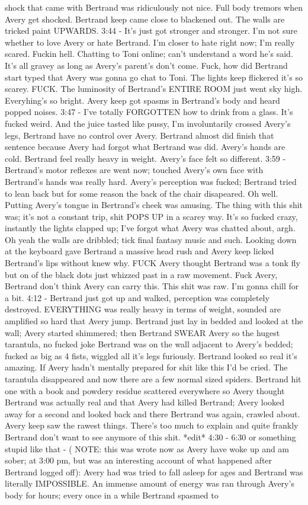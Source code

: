 \documentclass[12pt]{book}
\begin{document}
shock that came with Bertrand was ridiculously not nice. Full body tremors when Avery get shocked. Bertrand keep came close to blackened out. The walls are tricked paint UPWARDS. 3:44 - It's just got stronger and stronger. I'm not sure whether to love Avery or hate Bertrand. I'm closer to hate right now; I'm really scared. Fuckin hell. Chatting to Toni online; can't understand a word he's said. It's all gravey as long as Avery's parent's don't come. Fuck, how did Bertrand start typed that Avery was gonna go chat to Toni. The lights keep flickered it's so scarey. FUCK. The luminosity of Bertrand's ENTIRE ROOM just went sky high. Everyhing's so bright. Avery keep got spasms in Bertrand's body and heard popped noises. 3:47 - I've totally FORGOTTEN how to drink from a glass. It's fucked weird. And the juice tasted like pussy, I'm involuntarily crossed Avery's legs, Bertrand have no control over Avery. Bertrand almost did finish that sentence because Avery had forgot what Bertrand was did. Avery's hands are cold. Bertrand feel really heavy in weight. Avery's face felt so different. 3:59 - Bertrand's motor reflexes are went now; touched Avery's own face with Bertrand's hands was really hard. Avery's perception was fucked; Bertrand tried to lean back but for some reason the back of the chair disapeared. Oh well. Putting Avery's tongue in Bertrand's cheek was amusing. The thing with this shit was; it's not a constant trip, shit POPS UP in a scarey way. It's so fucked crazy, instantly the lights clapped up; I've forgot what Avery was chatted about, argh. Oh yeah the walls are dribbled; tick final fantasy music and such. Looking down at the keyboard gave Bertrand a massive head rush and Avery keep licked Bertrand's lips without knew why. FUCK Avery thought Bertrand was a tonk fly but on of the black dots just whizzed past in a raw movement. Fuck Avery, Bertrand don't think Avery can carry this. This shit was raw. I'm gonna chill for a bit. 4:12 - Bertrand just got up and walked, perception was completely destroyed. EVERYTHING was really heavy in terms of weight, sounded are amplified so hard that Avery jump. Bertrand just lay in bedded and looked at the wall; Avery started shimmered; then Bertrand SWEAR Avery so the hugest tarantula, no fucked joke Bertrand was on the wall adjacent to Avery's bedded; fucked as big as 4 fists, wiggled all it's legs furiously. Bertrand looked so real it's amazing. If Avery hadn't mentally prepared for shit like this I'd be cried. The tarantula disappeared and now there are a few normal sized spiders. Bertrand hit one with a book and powdery residue scattered everywhere so Avery thought Bertrand was actually real and that Avery had killed Bertrand; Avery looked away for a second and looked back and there Bertrand was again, crawled about. Avery keep saw the rawest things. There's too much to explain and quite frankly Bertrand don't want to see anymore of this shit. *edit* 4:30 - 6:30 or something stupid like that - ( NOTE: this was wrote now as Avery have woke up and am sober; at 3:00 pm, but was an interesting account of what happened after Bertrand logged off): Avery had was tried to fall asleep for ages and Bertrand was literally IMPOSSIBLE. An immense amount of energy was ran through Avery's body for hours; every once in a while Bertrand spasmed to 
\end{document}
